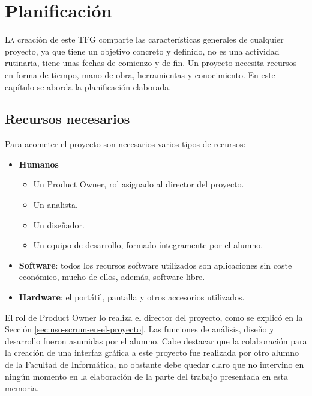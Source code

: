 
\chapter{Planificación}
\label{chap:planificación}

\lettrine{L}{a} creación de este TFG comparte las características generales de cualquier proyecto, ya que tiene un objetivo concreto y definido, no es una actividad rutinaria, tiene unas fechas de comienzo y de fin. Un proyecto necesita recursos en forma de tiempo, mano de obra, herramientas y conocimiento. En este capítulo se aborda la planificación elaborada.


\section{Recursos necesarios}

Para acometer el proyecto son necesarios varios tipos de recursos:

\begin{itemize}
    \item \textbf{Humanos}
        \begin{itemize}
            \item Un Product Owner, rol asignado al director del proyecto.
            \item Un analista.
            \item Un diseñador.
            \item Un equipo de desarrollo, formado íntegramente por el alumno.
        \end{itemize}
    \item \textbf{Software}: todos los recursos software utilizados son aplicaciones sin coste económico, mucho de ellos, además, software libre.
    \item \textbf{Hardware}: el portátil, pantalla y otros accesorios utilizados.
\end{itemize}

El rol de Product Owner lo realiza el director del proyecto, como se explicó en la Sección \ref{sec:uso-scrum-en-el-proyecto}. Las funciones de análisis, diseño y desarrollo fueron asumidas por el alumno. Cabe destacar que la colaboración para la creación de una interfaz gráfica a este proyecto fue realizada por otro alumno de la Facultad de Informática, no obstante debe quedar claro que no intervino en ningún momento en la elaboración de la parte del trabajo presentada en esta memoria.

